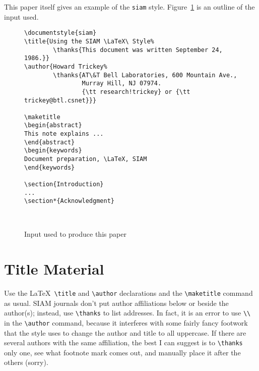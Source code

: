 This paper itself gives an example of the {\tt siam} style.
Figure~\ref{outline-fig} is an outline of the input used.

\begin{figure}
\begin{center}
\begin{verbatim}
\documentstyle{siam}
\title{Using the SIAM \LaTeX\ Style%
        \thanks{This document was written September 24, 1986.}}
\author{Howard Trickey%
        \thanks{AT\&T Bell Laboratories, 600 Mountain Ave.,
                Murray Hill, NJ 07974.
                {\tt research!trickey} or {\tt trickey@btl.csnet}}}

\maketitle
\begin{abstract}
This note explains ...
\end{abstract}
\begin{keywords}
Document preparation, \LaTeX, SIAM
\end{keywords}

\section{Introduction}
...
\section*{Acknowledgment}



\end{verbatim}
\end{center}
\caption{Input used to produce this paper}\label{outline-fig}
\end{figure}

\section{Title Material}
Use the \LaTeX\ \verb|\title| and \verb|\author| declarations and the
\verb|\maketitle| command as usual.
SIAM journals don't put author affiliations below or beside
the author(s); instead, use \verb|\thanks| to list addresses.
In fact, it is an error to use \verb|\\| in the \verb|\author|
command, because it interferes with some fairly fancy
footwork that the style uses to change the author and title
to all uppercase.
If there are several authors with the same affiliation,
the best I can suggest is to \verb|\thanks| only one, see
what footnote mark comes out, and manually place it after
the others (sorry).

